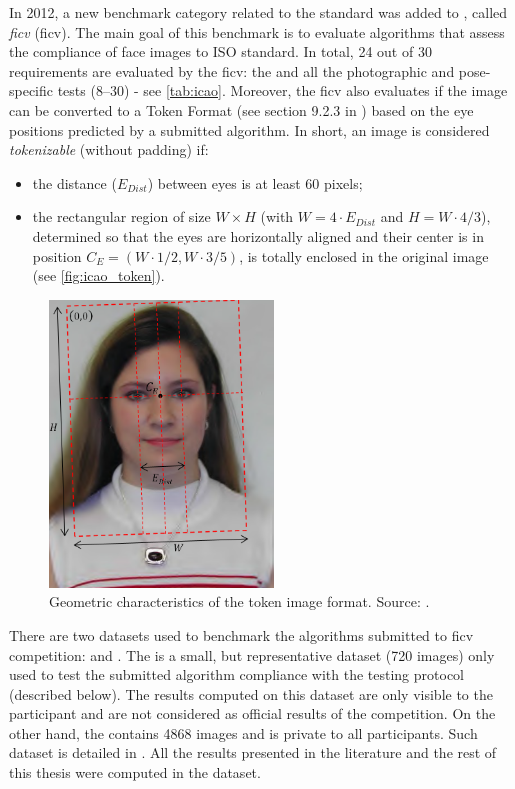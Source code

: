 In 2012, a new benchmark category related to the \icao standard was added to \fvcongoing \citep{ferrara2012face}, called \textit{\acl{ficv}} (\acs{ficv}). The main goal of this benchmark is to evaluate algorithms that assess the compliance of face images to ISO standard. In total, 24 out of 30 requirements are evaluated by the \acs{ficv}: the \citeReq{\eyecenterlocation} and all the photographic and pose-specific tests (8--30) - see \autoref{tab:icao}. Moreover, the \acs{ficv} also evaluates if the image can be converted to a Token Format (see section 9.2.3 in \citep{iso-iec}) based on the eye positions predicted by a submitted algorithm. In short, an image is considered \textit{tokenizable} (without padding) if:

\begin{itemize}
\item the distance ($E_{Dist}$) between eyes is at least 60 pixels;
\item the rectangular region of size $W \times H$ (with $W=4\cdot E_{Dist}$ and $H=W \cdot 4/3$), determined so that the eyes are horizontally aligned and their center is in position $C_E=(W\cdot1/2,W\cdot3/5)$, is totally enclosed in the original image (see \autoref{fig:icao_token}).
\end{itemize}

\begin{figure}[ht]
    \centering
    \includegraphics[height=3.0in]{images/icao_tokenizable.png}
    \caption{Geometric characteristics of the token image format. Source: \citep{fvcongoing}.}
    \label{fig:icao_token}
\end{figure}

There are two datasets used to benchmark the algorithms submitted to \acs{ficv} competition: \ficvtest and \ficvofficial. The \ficvtest is a small, but representative dataset (720 images) only used to test the submitted algorithm compliance with the testing protocol (described below). The results computed on this dataset are only visible to the participant and are not considered as official results of the competition. On the other hand, the \ficvofficial contains 4868 images and is private to all participants. Such dataset is detailed in \cite{ferrara2012face}. All the results presented in the literature and the rest of this thesis were computed in the \ficvofficial dataset.

